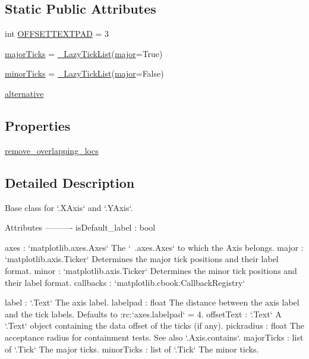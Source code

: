 \subsection*{Static Public Attributes}
\begin{DoxyCompactItemize}
\item 
int \hyperlink{classmatplotlib_1_1axis_1_1Axis_ae68e17b663d70a2f94e0448426a4a115}{O\+F\+F\+S\+E\+T\+T\+E\+X\+T\+P\+AD} = 3
\item 
\hyperlink{classmatplotlib_1_1axis_1_1Axis_a60a3c3b57331c140c98495adf5bc16ff}{major\+Ticks} = \hyperlink{classmatplotlib_1_1axis_1_1__LazyTickList}{\+\_\+\+Lazy\+Tick\+List}(\hyperlink{classmatplotlib_1_1axis_1_1Axis_a349fa77c014c5e44f472634075372df2}{major}=True)
\item 
\hyperlink{classmatplotlib_1_1axis_1_1Axis_a16736aac0d24e76e697a5a0907cc825f}{minor\+Ticks} = \hyperlink{classmatplotlib_1_1axis_1_1__LazyTickList}{\+\_\+\+Lazy\+Tick\+List}(\hyperlink{classmatplotlib_1_1axis_1_1Axis_a349fa77c014c5e44f472634075372df2}{major}=False)
\item 
\hyperlink{classmatplotlib_1_1axis_1_1Axis_a4d40b6d71b3262e144c1e58faf7ebbb8}{alternative}
\end{DoxyCompactItemize}
\subsection*{Properties}
\begin{DoxyCompactItemize}
\item 
\hyperlink{classmatplotlib_1_1axis_1_1Axis_a68ee3542bbed21240da63d12cd29c1f7}{remove\+\_\+overlapping\+\_\+locs}
\end{DoxyCompactItemize}


\subsection{Detailed Description}
\begin{DoxyVerb}Base class for `.XAxis` and `.YAxis`.

Attributes
----------
isDefault_label : bool

axes : `matplotlib.axes.Axes`
    The `~.axes.Axes` to which the Axis belongs.
major : `matplotlib.axis.Ticker`
    Determines the major tick positions and their label format.
minor : `matplotlib.axis.Ticker`
    Determines the minor tick positions and their label format.
callbacks : `matplotlib.cbook.CallbackRegistry`

label : `.Text`
    The axis label.
labelpad : float
    The distance between the axis label and the tick labels.
    Defaults to :rc:`axes.labelpad` = 4.
offsetText : `.Text`
    A `.Text` object containing the data offset of the ticks (if any).
pickradius : float
    The acceptance radius for containment tests. See also `.Axis.contains`.
majorTicks : list of `.Tick`
    The major ticks.
minorTicks : list of `.Tick`
    The minor ticks.
\end{DoxyVerb}
 

